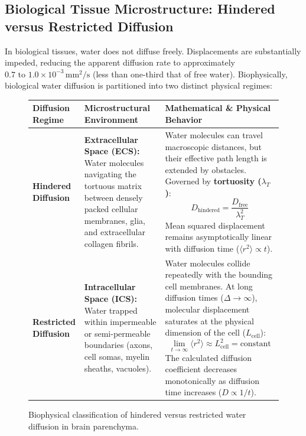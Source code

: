 \documentclass[11pt,a4paper]{article}
\begin{document}
\subsection{Biological Tissue Microstructure: Hindered versus Restricted Diffusion}

In biological tissues, water does not diffuse freely. Displacements are substantially impeded, reducing the apparent diffusion rate to approximately \textbf{$0.7\text{ to }1.0 \times 10^{-3}\,\text{mm}^2/\text{s}$} (less than one-third that of free water). Biophysically, biological water diffusion is partitioned into two distinct physical regimes:

\begin{figure}[htbp]
\centering
\setlength{\tabcolsep}{4pt}
\begin{tabular}{p{3.5cm}p{5.5cm}p{5.5cm}}
\toprule
\textbf{Diffusion Regime} & \textbf{Microstructural Environment} & \textbf{Mathematical \& Physical Behavior} \\
\midrule
\textbf{Hindered Diffusion} & \textbf{Extracellular Space (ECS):} Water molecules navigating the tortuous matrix between densely packed cellular membranes, glia, and extracellular collagen fibrils. & Water molecules can travel macroscopic distances, but their effective path length is extended by obstacles. Governed by \textbf{tortuosity ($\lambda_T$)}:
\begin{equation*}
    D_{\text{hindered}} = \frac{D_{\text{free}}}{\lambda_T^2}
\end{equation*}
Mean squared displacement remains asymptotically linear with diffusion time ($\langle r^2 \rangle \propto t$). \\
\addlinespace
\textbf{Restricted Diffusion} & \textbf{Intracellular Space (ICS):} Water trapped within impermeable or semi-permeable boundaries (axons, cell somas, myelin sheaths, vacuoles). & Water molecules collide repeatedly with the bounding cell membranes. At long diffusion times ($\Delta \to \infty$), molecular displacement saturates at the physical dimension of the cell ($L_{\text{cell}}$):
\begin{equation*}
    \lim_{t \to \infty} \langle r^2 \rangle \approx L_{\text{cell}}^2 = \text{constant}
\end{equation*}
The calculated diffusion coefficient decreases monotonically as diffusion time increases ($D \propto 1/t$). \\
\bottomrule
\end{tabular}
\caption{Biophysical classification of hindered versus restricted water diffusion in brain parenchyma.}
\label{tab:hindered_restricted}
\end{figure}
\end{document}
